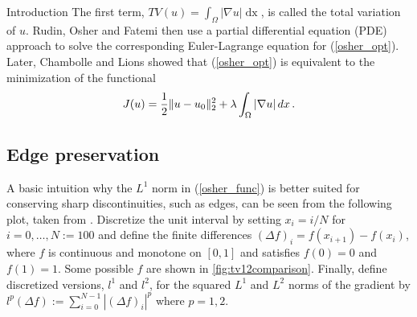 \begin{chapter}{Introduction}
The first term, $TV(u)=\int_\Omega\left\vert\nabla u\right\vert\mathop{dx}$, is called the total variation of $u$. Rudin, Osher and Fatemi then use a partial differential equation (PDE) approach to solve
the corresponding Euler-Lagrange equation for (\ref{osher_opt}). Later, Chambolle and Lions \cite{ChambolleLions} showed that (\ref{osher_opt}) is equivalent to the minimization of
the functional
\begin{equation}
    \label{osher_func}
    J(u)=\frac{1}{2}\| u-u_0 \|_2^2 +\lambda \int_\Omega\left\vert\nabla u\right\vert\mathop{dx}.
\end{equation}

\subsection{Edge preservation} %
\label{sub:Edge preservation}
A basic intuition why the $L^1$ norm in (\ref{osher_func}) is better suited for conserving sharp discontinuities, such as edges, can be seen from the following plot, taken from \cite{SceneFlow}. 
Discretize the unit interval by setting $x_i=i/N$ for $i=0,\ldots,N:=100$ and define the finite differences
$(\Delta f)_i=f(x_{i+1})-f(x_i)$, where $f$ is continuous and monotone on $[0,1]$ and satisfies $f(0)=0$ and $f(1)=1$.
Some possible $f$ are shown in \ref{fig:tv12comparison}. Finally, define discretized versions, $l^1$ and $l^2$,
for the squared $L^1$ and $L^2$ norms of the gradient by $l^p(\Delta f):=\sum_{i=0}^{N-1}|(\Delta f)_i|^p$
where $p=1,2$.

 

\end{chapter}
